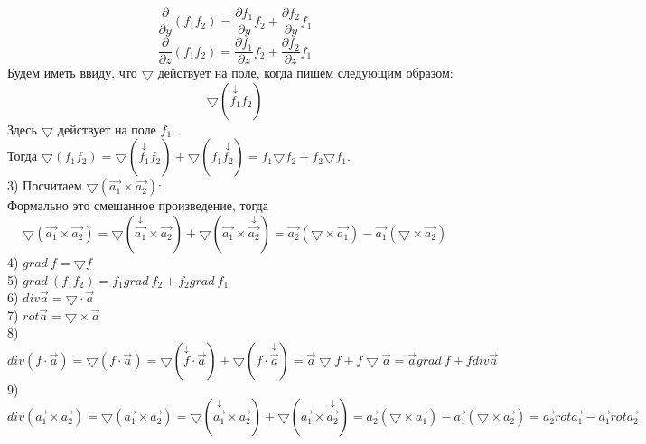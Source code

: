 \documentclass[12pt]{article}
\begin{document}
$$\frac{\partial}{\partial y}(f_1 f_2) = \frac{\partial f_1}{\partial y} f_2 + \frac{\partial f_2}{\partial y} f_1$$
$$\frac{\partial}{\partial z}(f_1 f_2) = \frac{\partial f_1}{\partial z} f_2 + \frac{\partial f_2}{\partial z} f_1$$
Будем иметь ввиду, что $\bigtriangledown$ действует на поле, когда пишем следующим образом:\\
$$\bigtriangledown(\overset{\downarrow}{f_1} f_2)$$
Здесь $\bigtriangledown$ действует на поле $f_1$.\\
Тогда $\bigtriangledown(f_1 f_2) = \bigtriangledown(\overset{\downarrow}{f_1} f_2) + \bigtriangledown(f_1 \overset{\downarrow}{f_2}) = f_1 {\bigtriangledown f_2} + f_2 {\bigtriangledown f_1}$.\\
3) Посчитаем $\bigtriangledown(\overrightarrow{a_1} \times \overrightarrow{a_2})$:\\
Формально это смешанное произведение, тогда\\
$$\bigtriangledown(\overrightarrow{a_1} \times \overrightarrow{a_2}) = \bigtriangledown(\overset{\downarrow}{\overrightarrow{a_1}} \times \overrightarrow{a_2}) + \bigtriangledown(\overrightarrow{a_1} \times \overset{\downarrow}{\overrightarrow{a_2}}) = \overrightarrow{a_2}(\bigtriangledown \times \overrightarrow{a_1})-\overrightarrow{a_1}(\bigtriangledown \times \overrightarrow{a_2})$$
4) $grad \ f = {\bigtriangledown f}$\\
5) $grad \ (f_1 f_2) = f_1 grad \ f_2 + f_2 grad \ f_1$\\
6) $div \overrightarrow{a} = \bigtriangledown \cdot \overrightarrow{a}$\\
7) $rot \overrightarrow{a} = \bigtriangledown \times \overrightarrow{a}$\\
8) $div (f \cdot \overrightarrow{a}) = \bigtriangledown(f \cdot \overrightarrow{a}) = \bigtriangledown(\overset{\downarrow}{f} \cdot \overrightarrow{a}) + \bigtriangledown(f \cdot \overset{\downarrow}{\overrightarrow{a}}) =\overrightarrow{a} \bigtriangledown f + f \bigtriangledown \overrightarrow{a} = \overrightarrow{a} grad \ f + f div \overrightarrow{a}$\\
9) $div (\overrightarrow{a_1} \times \overrightarrow{a_2}) = \bigtriangledown(\overrightarrow{a_1} \times \overrightarrow{a_2}) = \bigtriangledown(\overset{\downarrow}{\overrightarrow{a_1}} \times \overrightarrow{a_2}) + \bigtriangledown(\overrightarrow{a_1} \times \overset{\downarrow}{\overrightarrow{a_2}}) = \overrightarrow{a_2}(\bigtriangledown \times \overrightarrow{a_1}) - \overrightarrow{a_1} (\bigtriangledown \times \overrightarrow{a_2}) = \overrightarrow{a_2} rot \overrightarrow{a_1} - \overrightarrow{a_1} rot \overrightarrow{a_2}$\\
\end{document}

